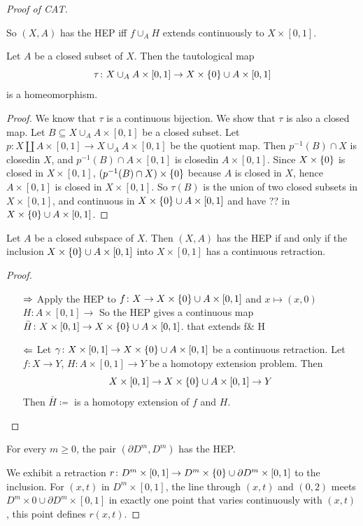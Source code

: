\documentclass{TemplateLecture}
\begin{document}
\begin{proof}[Proof of CAT]
\begin{proposition}
        So \((X,A)\) has the HEP iff \(f\cup_A H\) extends continuously to \(X\times [0,1]\).
    \end{proposition}
    \begin{lem}
        Let \(A\) be a closed subset of \(X\). Then the tautological map
        \[\tau\colon X\cup_A A\times [0,1] \to X \times \{0\} \cup A \times [0,1]\] is a homeomorphism.
    \end{lem}
    \begin{proof}
        We know that \(\tau\) is a continuous bijection. We show that \(\tau\) is also a closed map. Let \(B\subseteq X\cup_A A\times [0,1]\) be a closed subset. Let \(p\colon X \amalg A \times [0,1] \to X \cup_A A\times [0,1]\) be the quotient map. Then \(p^{-1}(B) \cap X\) is closedin \(X\), and \(p^{-1}(B) \cap A \times[0,1]\) is closedin \(A\times [0,1]\). Since \(X\times \{0\}\) is closed in \(X\times [0,1]\), \((p^{-1}(B)\cap X) \times \{0\}\) because \(A\) is closed in \(X\), hence \(A\times [0,1]\) is closed in \(X\times [0,1]\).
        So \(\tau(B)\) is the union of two closed subsets in \(X\times [0,1]\), and continuous in \(X\times \{0\} \cup A \times [0,1]\) and have ?? in \(X\times \{0\} \cup A \times [0,1]\).
    \end{proof}
    \begin{corollary}
        Let \(A\) be a closed subspace of \(X\). Then \((X,A)\) has the HEP if and only if the inclusion \(X\times \{0\} \cup A \times [0,1]\) into \(X\times [0,1]\) has a continuous retraction.
    \end{corollary}
    \begin{proof}
        \begin{itemize}
            \item[\(\Rightarrow\)] Apply the HEP to \(f\colon X \to X\times \{0\} \cup A \times [0,1]\) and \(x \mapsto (x,0)\)
            \(H\colon A \times[0,1] \to \)%
            So the HEP gives a continuous map \(\bar H\colon X \times [0,1] \to X\times\{0\} \cup A \times [0,1]\). that extends f\& H
            \item[\(\Leftarrow\)] Let \(\gamma \colon X \times [0,1] \to X \times \{0\} \cup A \times [0,1]\) be a continuous retraction. Let \(f\colon X\to Y\), \(H\colon A \times [0,1] \to Y\) be a homotopy extension problem. Then
            \[X \times [0,1] \to X \times \{0\} \cup A \times [0,1] \to Y\]
            Then \(\bar H \coloneq \)%
            is a homotopy extension of \(f\) and \(H\).
        \end{itemize}
    \end{proof}
    \begin{proposition}
        For every \(m \geq 0\), the pair \((\partial D^m, D^m)\) has the HEP. 
    \end{proposition}
    We exhibit a retraction \(r\colon D^m \times [0,1] \to D^m \times \{0\} \cup \partial D^m \times [0,1]\) to the inclusion.
    For \((x,t) \) in \(D^m \times [0,1]\), the line through \((x,t)\) and \((0,2)\) meets \(D^m \times 0 \cup \partial D^m \times [0,1]\) in exactly one point that varies continuously with \((x,t)\), this point defines \(r(x,t)\).


\end{proof}
\end{document}
